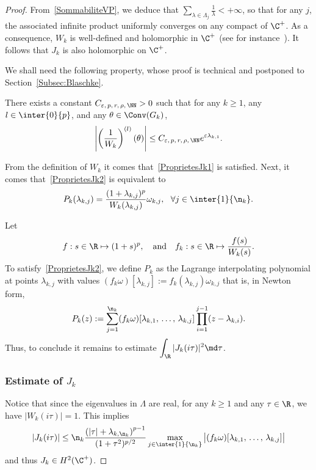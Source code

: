 \begin{proof}
From~\eqref{SommabiliteVP}, we deduce that $\sum_{\lambda\in \Lambda_j}\frac{1}{\lambda}<+\infty$, so that for any $j$, the associated infinite product uniformly converges on any compact of $\C^+$. As a consequence, $W_k$ is well-defined and holomorphic in $\C^+$ (see for instance~\cite[Chapter~15]{RudinAnalyseComplexe}). It follows that $J_k$ is also holomorphic on $\C^+$.

We shall need the following property, whose proof is technical and postponed to Section~\ref{Subsec:Blaschke}.

\begin{prop}\label{Proposition:Blaschke}
There exists a constant $C_{\varepsilon,\,p,\,r,\,\rho,\,\NN}>0$ such that for any $k\geq 1$, any $l \in \inter{0}{p}$, and any $\theta\in \Conv (G_k)$,
\begin{equation}\label{EstimeeFinaleBlaschke}
\left| \left(\frac{1}{W_k} \right)^{(l)}(\theta) \right| \leq C_{\varepsilon,\,p,\,r,\, \rho,\,\NN} e^{\varepsilon \lambda_{k,1}}.
\end{equation}
\end{prop}

From the definition of $W_k$ it comes that~\eqref{ProprietesJk1} is satisfied. Next, it comes that~\eqref{ProprietesJk2} is equivalent to
\[
P_k(\lambda_{k,j}) = \frac{(1+\lambda_{k,j})^p}{W_k(\lambda_{k,j})} \omega_{k,j}, \ \ \forall j\in \inter{1}{\n_k}.
\]

Let
\[
f : s \in \R \mapsto (1+s)^p,
\quad \text{and} \quad f_k : s \in \R \mapsto \frac{f(s)}{W_k(s)}.
\]
To satisfy~\eqref{ProprietesJk2}, we define $P_k$ as the Lagrange interpolating polynomial at points $\lambda_{k,j}$ with values $(f_k \omega)[\lambda_{k,j}]:=f_k(\lambda_{k,j}) \omega_{k,j}$ that is, in Newton form,
\begin{equation*}\label{Def:Pk}
P_k(z) := \sum_{j=1}^{\n_k} (f_k \omega) [\lambda_{k,1},\,\dots,\,\lambda_{k,j}] \prod_{i=1}^{j-1} (z-\lambda_{k,i}).
\end{equation*}
Thus, to conclude it remains to estimate $\displaystyle \int_\R |J_k(i \tau)|^2 \md \tau$.


\subsubsection{Estimate of $J_k$}

Notice that since the eigenvalues in $\Lambda$ are real, for any $k \geq 1$ and any $\tau \in \R$, we have $|W_k(i \tau)|=1$. This implies
\begin{equation}\label{Estimee_Jk_intermediaire}
|J_k(i \tau)| \leq \n_k \frac{\left(|\tau|+\lambda_{k,\n_k}\right)^{p-1}}{(1+\tau^2)^{p/2}} \max_{j\in \inter{1}{\n_k}} \big| (f_k \omega) [\lambda_{k,1},\,\dots,\, \lambda_{k,j}] \big|
\end{equation}
and thus $J_k \in H^2(\C^+)$.



\end{proof}

